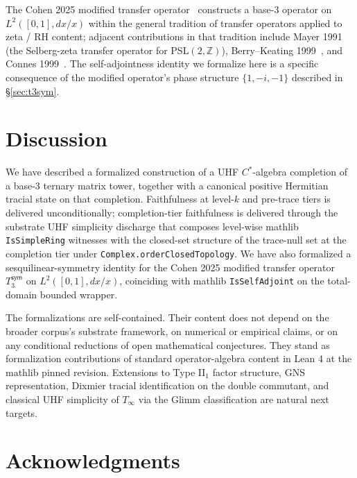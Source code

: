 \documentclass[11pt,a4paper]{amsart}
\theoremstyle{plain}
\theoremstyle{definition}
\begin{document}
The Cohen 2025 modified transfer operator~\cite{cohen2025transferOp} constructs a base-3 operator on $L^2([0,1], dx/x)$ within the general tradition of transfer operators applied to zeta / RH content; adjacent contributions in that tradition include Mayer 1991~\cite{mayer1991} (the Selberg-zeta transfer operator for PSL$(2, \mathbb{Z})$), Berry--Keating 1999~\cite{berry-keating1999}, and Connes 1999~\cite{connes1999}. The self-adjointness identity we formalize here is a specific consequence of the modified operator's phase structure $\{1, -i, -1\}$ described in \S\ref{sec:t3sym}.

\section{Discussion}\label{sec:discussion}

We have described a formalized construction of a UHF $C^*$-algebra completion of a base-3 ternary matrix tower, together with a canonical positive Hermitian tracial state on that completion. Faithfulness at level-$k$ and pre-trace tiers is delivered unconditionally; completion-tier faithfulness is delivered through the substrate UHF simplicity discharge that composes level-wise mathlib \texttt{IsSimpleRing} witnesses with the closed-set structure of the trace-null set at the completion tier under \texttt{Complex.orderClosedTopology}. We have also formalized a sesquilinear-symmetry identity for the Cohen 2025 modified transfer operator $T_3^{\textsf{sym}}$ on $L^2([0,1], dx/x)$, coinciding with mathlib \texttt{IsSelfAdjoint} on the total-domain bounded wrapper.

The formalizations are self-contained. Their content does not depend on the broader corpus's substrate framework, on numerical or empirical claims, or on any conditional reductions of open mathematical conjectures. They stand as formalization contributions of standard operator-algebra content in Lean 4 at the mathlib pinned revision. Extensions to Type II$_1$ factor structure, GNS representation, Dixmier tracial identification on the double commutant, and classical UHF simplicity of $T_\infty$ via the Glimm classification are natural next targets.

\section*{Acknowledgments}
\end{document}
